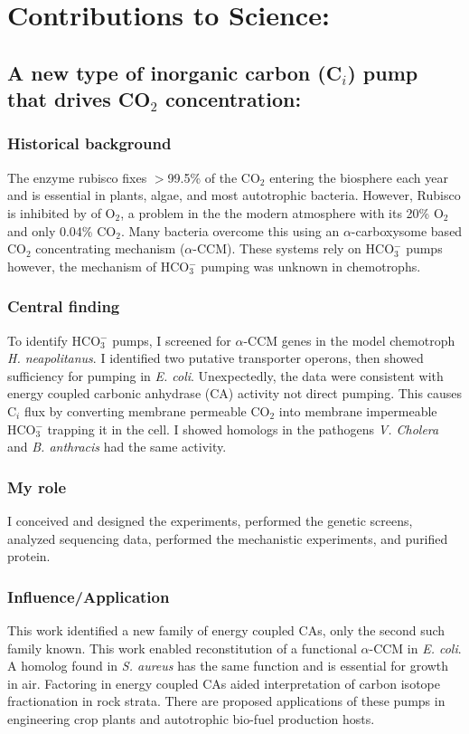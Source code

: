 \documentclass{article}
\begin{document}
\section*{Contributions to Science:}
\newrefsection
\subsection{A new type of inorganic carbon (C$_i$) pump that drives CO$_2$ concentration:}
\subsubsection{Historical background}
The enzyme rubisco fixes $>$99.5\% of the CO$_2$ entering the biosphere each year and is essential in plants, algae, and most autotrophic bacteria. 
However, Rubisco is inhibited by of O$_2$, a problem in the the modern atmosphere with its 20\% O$_2$ and only 0.04\% CO$_2$.
Many bacteria overcome this using an $\alpha$-carboxysome based CO$_2$ concentrating mechanism ($\alpha$-CCM).
These systems rely on HCO$_{3}^{-}$ pumps however, the mechanism of HCO$_{3}^{-}$ pumping was unknown in chemotrophs.
%
\subsubsection{Central finding}
To identify HCO$_{3}^{-}$ pumps, I screened for $\alpha$-CCM genes in the model chemotroph \textit{H. neapolitanus}.
I identified two putative transporter operons, then showed sufficiency for pumping in \textit{E. coli}. 
Unexpectedly, the data were consistent with energy coupled carbonic anhydrase (CA) activity not direct pumping.
This causes C$_i$ flux by converting membrane permeable CO$_2$ into membrane impermeable HCO$_{3}^{-}$ trapping it in the cell.
I showed homologs in the pathogens \textit{V. Cholera} and \textit{B. anthracis} had the same activity.
%
\subsubsection{My role}
I conceived and designed the experiments, performed the genetic screens, analyzed sequencing data, performed the mechanistic experiments, and purified protein.
%
\subsubsection{Influence/Application}
This work identified a new family of energy coupled CAs, only the second such family known.
This work enabled reconstitution of a functional $\alpha$-CCM in \textit{E. coli}. 
A homolog found in \textit{S. aureus} has the same function and is essential for growth in air. 
Factoring in energy coupled CAs aided interpretation of carbon isotope fractionation in rock strata.
There are proposed applications of these pumps in engineering crop plants and autotrophic bio-fuel production hosts.
%
\nocite{Desmarais2019-yc,Desmarais2018-ac,Desmarais2019-dc}
\printbibliography[heading=none]
\end{document}
